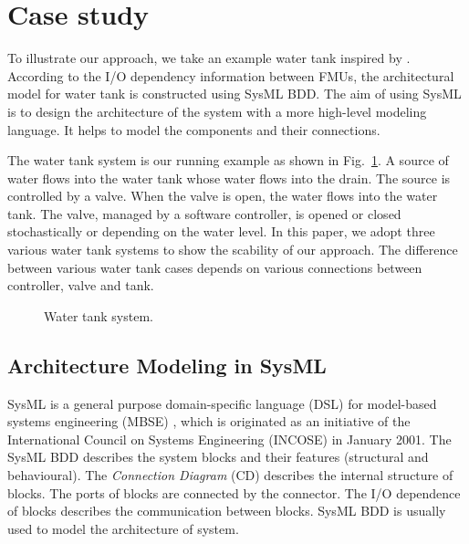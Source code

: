 
\section{Case study}
\label{sec:sysml}
To illustrate our approach, we take an example water tank inspired by \cite{AmalioPCW16}. According to the I/O dependency information between FMUs, the architectural model for water tank is constructed using SysML BDD. The aim of using SysML is to design the architecture of the system with a more high-level modeling language. It helps to model the components and their connections.

The water tank system is our running example as shown in Fig.~\ref{tankfig}. A source of water flows into the water tank whose water flows into the drain. The source is controlled by a valve. When the valve is open, the water flows into the water tank. The valve, managed by a software controller, is opened or closed stochastically or depending on the water level. In this paper, we adopt three various water tank systems to show the scability of our approach. The difference between various water tank cases depends on various connections between controller, valve and tank. 
\begin{figure}[htbp]
	\caption{Water tank system.}
	\label{tankfig}
\end{figure} 
\subsection{Architecture Modeling in SysML}
SysML is a general purpose domain-specific language (DSL) \cite{SemerathBHSV17} for model-based systems engineering (MBSE) \cite{Dori16}, which is originated as an initiative of the International Council on Systems Engineering (INCOSE) \cite{Pepper2015International} in January 2001. The SysML BDD describes the system blocks and their features (structural and behavioural). The \textit{Connection Diagram} (CD) describes the internal structure of blocks. The ports of blocks are connected by the connector. The I/O dependence of blocks describes the communication between blocks. SysML BDD is usually used to model the architecture of system.

